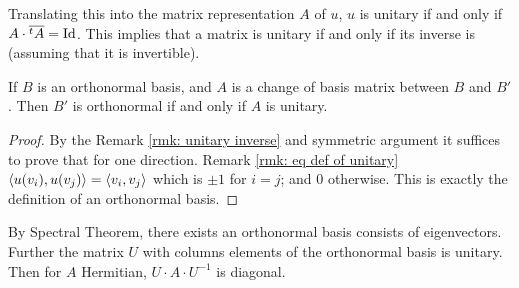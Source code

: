 \documentclass{article}
\begin{document}
\begin{remark}\label{rmk: unitary inverse}
    Translating this into the matrix representation $A$ of $u$, $u$ is unitary if and only if $A \cdot \overline{^t A} = \mathrm{Id}$. This implies that a matrix is unitary if and only if its inverse is (assuming that it is invertible). 
\end{remark}

\begin{proposition}
    If $B$ is an orthonormal basis, and $A$ is a change of basis matrix between $B$ and $B'$. Then $B'$ is orthonormal if and only if $A$ is unitary.
\end{proposition}

\begin{proof}
    By the Remark \ref{rmk: unitary inverse} and symmetric argument it suffices to prove that for one direction. Remark \ref{rmk: eq def of unitary} $\left\langle u(v_i), u(v_j) \right\rangle = \left\langle v_i, v_j \right\rangle$ which is $\pm 1$ for $i = j$; and 0 otherwise. This is exactly the definition of an orthonormal basis. 
\end{proof}

\begin{remark}
    By Spectral Theorem, there exists an orthonormal basis consists of eigenvectors. Further the matrix $U$ with columns elements of the orthonormal basis is unitary. Then for $A$ Hermitian, $U \cdot A \cdot U^{-1}$ is diagonal. 
\end{remark}
\end{document}
